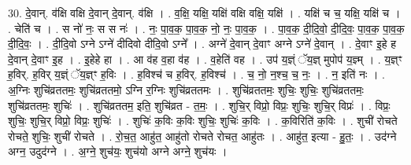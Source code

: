 \documentclass[17pt]{extarticle}
\begin{document}
30. दे॒वान्. व॑क्षि वक्षि दे॒वान् दे॒वान्. व॑क्षि । . व॒क्षि॒ यक्षि॒ यक्षि॑ वक्षि वक्षि॒ यक्षि॑ । . यक्षि॑ च च॒ यक्षि॒ यक्षि॑ च । . चेति॑ च । . स नो॑ नः॒ स स नः॑ । . नः॒ पा॒व॒क॒ पा॒व॒क॒ नो॒ नः॒ पा॒व॒क॒ । . पा॒व॒क॒ दी॒दि॒वो॒ दी॒दि॒वः॒ पा॒व॒क॒ पा॒व॒क॒ दी॒दि॒वः॒ । . दी॒दि॒वो ऽग्ने ऽग्ने॑ दीदिवो दीदि॒वो ऽग्ने᳚ । . अग्ने॑ दे॒वान् दे॒वाꣳ अग्ने ऽग्ने॑ दे॒वान् । . दे॒वाꣳ इ॒हे ह दे॒वान् दे॒वाꣳ इ॒ह । . इ॒हेहे हा । . आ व॑ह व॒हा व॑ह । . व॒हेति॑ वह । . उप॑ य॒ज्ञ्ं ॅय॒ज्ञ् मुपोप॑ य॒ज्ञ्म् । . य॒ज्ञ्ꣳ ह॒विर्. ह॒विर् य॒ज्ञ्ं ॅय॒ज्ञ्ꣳ ह॒विः । . ह॒विश्च॑ च ह॒विर्. ह॒विश्च॑ । . च॒ नो॒ न॒श्च॒ च॒ नः॒ । . न॒ इति॑ नः । . अ॒ग्निः शुचि॑व्रततमः॒ शुचि॑व्रततमो॒ ऽग्नि र॒ग्निः शुचि॑व्रततमः । . शुचि॑व्रततमः॒ शुचिः॒ शुचिः॒ शुचि॑व्रततमः॒ शुचि॑व्रततमः॒ शुचिः॑ । . शुचि॑व्रततम॒ इति॒ शुचि॑व्रत - त॒मः॒ । . शुचि॒र् विप्रो॒ विप्रः॒ शुचिः॒ शुचि॒र् विप्रः॑ । . विप्रः॒ शुचिः॒ शुचि॒र् विप्रो॒ विप्रः॒ शुचिः॑ । . शुचिः॑ क॒विः क॒विः शुचिः॒ शुचिः॑ क॒विः । . क॒विरिति॑ क॒विः । . शुची॑ रोचते रोचते॒ शुचिः॒ शुची॑ रोचते । . रो॒च॒त॒ आहु॑त॒ आहु॑तो रोचते रोचत॒ आहु॑तः । . आहु॑त॒ इत्या - हु॒तः॒ । . उद॑ग्ने अग्न॒ उदुद॑ग्ने । . अ॒ग्ने॒ शुच॑यः॒ शुच॑यो अग्ने अग्ने॒ शुच॑यः । \newline
\end{document}
